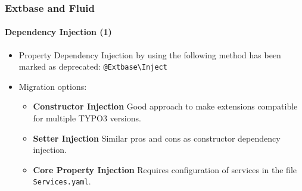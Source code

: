 %

\begin{frame}[fragile]
	\frametitle{Extbase and Fluid}
	\framesubtitle{Dependency Injection (1)}


	\begin{itemize}
		\item Property Dependency Injection by using the following method has
			been marked as deprecated:\newline
			\small\texttt{@Extbase\textbackslash Inject}\normalsize

		\item Migration options:

			\begin{itemize}\small
				\item \textbf{Constructor Injection}\newline
				 	Good approach to make extensions compatible for multiple TYPO3 versions.
				\item \textbf{Setter Injection}\newline
					Similar pros and cons as constructor dependency injection.
				\item \textbf{Core Property Injection}\newline
					Requires configuration of services in the file \texttt{Services.yaml}.
			\end{itemize}\normalsize

	\end{itemize}

\end{frame}

